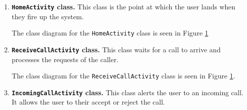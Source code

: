 \documentclass[12pt,svgnames,smaller]{article} %
\begin{document}
	\begin{enumerate}
		\begin{figure}
		\caption{Class Diagrams for \texttt{HomeActivity}, \texttt{ReceiveCallActivity}, \texttt{IncomingCallActivity}, \texttt{CallInSessionActivity} and \texttt{MakeCallActivity}}			\label{fig:SystemAnalysisandDesign-Class_Diagram_-_HomeActivity,_ReceiveCallActivity,_IncomingCallActivity,_CallInSessionActivity,_MakeCallActivity}
	\end{figure}

		\item \textbf{\texttt{HomeActivity} class.} This class is the point at which the user lands when they fire up the system. 
		
		The class diagram for the \texttt{HomeActivity} class is seen in Figure \ref{fig:SystemAnalysisandDesign-Class_Diagram_-_HomeActivity,_ReceiveCallActivity,_IncomingCallActivity,_CallInSessionActivity,_MakeCallActivity}
		
		\item \textbf{\texttt{ReceiveCallActivity} class.} This class waits for a call to arrive and processes the requests of the caller.
		
		The class diagram for the \texttt{ReceiveCallActivity} class is seen in Figure \ref{fig:SystemAnalysisandDesign-Class_Diagram_-_HomeActivity,_ReceiveCallActivity,_IncomingCallActivity,_CallInSessionActivity,_MakeCallActivity}.
		
		\item \textbf{\texttt{IncomingCallActivity} class.} This class alerts the user to an incoming call. It allows the user to their accept or reject the call.


\end{enumerate}
\end{document}
